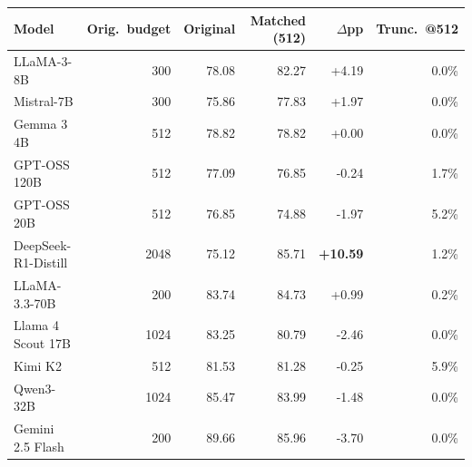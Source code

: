 \begin{tabular}{lrrrrr}
\toprule
Model & Orig.\ budget & Original & Matched (512) & $\Delta$pp & Trunc.\ @512 \\
\midrule
LLaMA-3-8B & 300 & 78.08 & 82.27 & +4.19 & 0.0\% \\
Mistral-7B & 300 & 75.86 & 77.83 & +1.97 & 0.0\% \\
Gemma 3 4B & 512 & 78.82 & 78.82 & +0.00 & 0.0\% \\
GPT-OSS 120B & 512 & 77.09 & 76.85 & -0.24 & 1.7\% \\
GPT-OSS 20B & 512 & 76.85 & 74.88 & -1.97 & 5.2\% \\
DeepSeek-R1-Distill & 2048 & 75.12 & 85.71 & \textbf{+10.59} & 1.2\% \\
LLaMA-3.3-70B & 200 & 83.74 & 84.73 & +0.99 & 0.2\% \\
Llama 4 Scout 17B & 1024 & 83.25 & 80.79 & -2.46 & 0.0\% \\
Kimi K2 & 512 & 81.53 & 81.28 & -0.25 & 5.9\% \\
Qwen3-32B & 1024 & 85.47 & 83.99 & -1.48 & 0.0\% \\
Gemini 2.5 Flash & 200 & 89.66 & 85.96 & -3.70 & 0.0\% \\
\bottomrule
\end{tabular}
